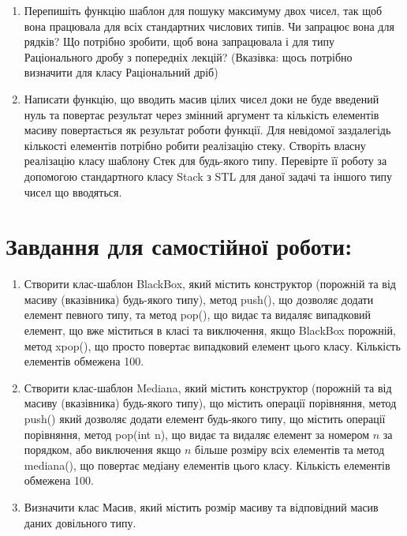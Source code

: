 \documentclass[a5paper,titlepage,openany,twoside,
]
{book_unv}%
\begin{document}
\begin{enumerate}
\begin{enumerate}
\begin{enumerate}
\def\labelenumi{\arabic{enumi})}

\item
  Перепишіть функцію шаблон для пошуку максимуму двох чисел,
  так щоб вона працювала для всіх стандартних числових типів.
Чи запрацює вона для рядків?
Що потрібно зробити, щоб вона запрацювала і для типу
Раціонального дробу з попередніх лекцій?
(Вказівка: щось потрібно визначити для класу Раціональний дріб)

\item
 Написати функцію, що вводить масив цілих чисел доки не буде введений нуль
та повертає результат через змінний аргумент та
кількість елементів масиву повертається як результат роботи функції.
Для невідомої заздалегідь кількості елементів потрібно робити реалізацію стеку.
Створіть власну реалізацію класу шаблону Стек для будь-якого типу. Перевірте її роботу за
допомогою стандартного класу Stack з STL для даної задачі та іншого типу чисел що вводяться.


\end{enumerate}

\section{Завдання для самостійної роботи:}

\begin{enumerate}
\def\labelenumi{\arabic{enumi})}
\setcounter{enumi}{2}
\item
  Створити клас-шаблон BlackBox, який містить конструктор
  (порожній та від масиву (вказівника) будь-якого типу), метод push(),
  що дозволяє додати елемент певного типу, та метод pop(), що видає та
  видаляє випадковий елемент, що вже міститься в класі та виключення,
  якщо BlackBox порожній, метод xpop(), що просто повертає випадковий
  елемент цього класу. Кількість елементів обмежена 100.
\item
  Створити клас-шаблон Mediana, який містить конструктор (порожній та
  від масиву (вказівника) будь-якого типу), що містить операції
  порівняння, метод push() який дозволяє додати елемент будь-якого типу,
  що містить операції порівняння, метод pop(int n), що видає та
  видаляє елемент за номером $n$ за порядком, або виключення якщо $n$ більше
  розміру всіх елементів та метод mediana(), що повертає медіану елементів
  цього класу. Кількість елементів обмежена 100.
\item
Визначити клас Масив, який містить розмір масиву та
відповідний масив даних довільного типу.


\end{enumerate}
\end{enumerate}
\end{enumerate}
\end{document}
